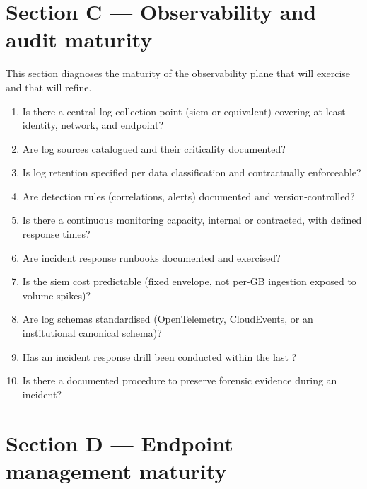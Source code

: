 \section{Section C --- Observability and audit maturity}
\label{sec:sa-observability}

This section diagnoses the maturity of the observability plane that
will exercise and that  will refine.

\begin{enumerate}[leftmargin=2em,nosep,label=C\arabic*.]
  \item Is there a central log collection point (\gls{siem} or
  equivalent) covering at least identity, network, and endpoint?

  \item Are log sources catalogued and their criticality documented?

  \item Is log retention specified per data classification and
  contractually enforceable?

  \item Are detection rules (correlations, alerts) documented and
  version-controlled?

  \item Is there a continuous monitoring capacity, internal or
  contracted, with defined response times?

  \item Are incident response runbooks documented and exercised?

  \item Is the \gls{siem} cost predictable (fixed envelope, not
  per-GB ingestion exposed to volume spikes)?

  \item Are log schemas standardised (OpenTelemetry, CloudEvents, or
  an institutional canonical schema)?

  \item Has an incident response drill been conducted within the last
  ?

  \item Is there a documented procedure to preserve forensic evidence
  during an incident?
\end{enumerate}

\section{Section D --- Endpoint management maturity}
\label{sec:sa-endpoint}

